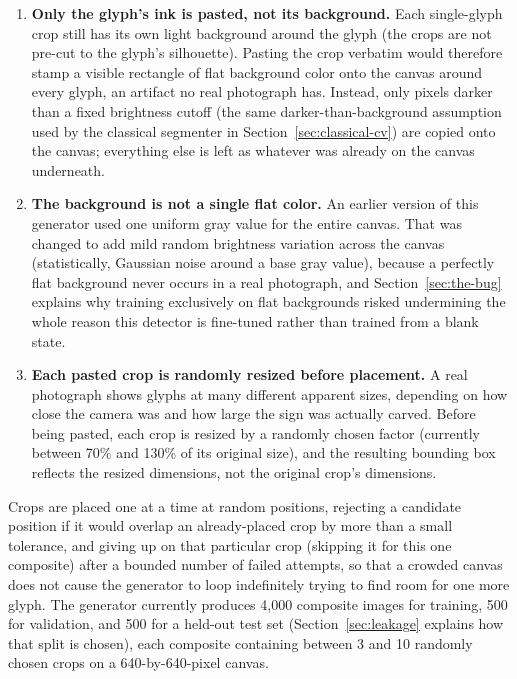 \documentclass[11pt,a4paper]{report}
\begin{document}
\begin{enumerate}[label=(\arabic*)]
  \item \textbf{Only the glyph's ink is pasted, not its background.} Each
    single-glyph crop still has its own light background around the glyph
    (the crops are not pre-cut to the glyph's silhouette). Pasting the crop
    verbatim would therefore stamp a visible rectangle of flat background
    color onto the canvas around every glyph, an artifact no real
    photograph has. Instead, only pixels darker than a fixed brightness
    cutoff (the same darker-than-background assumption used by the
    classical segmenter in Section~\ref{sec:classical-cv}) are copied onto
    the canvas; everything else is left as whatever was already on the
    canvas underneath.
  \item \textbf{The background is not a single flat color.} An earlier
    version of this generator used one uniform gray value for the entire
    canvas. That was changed to add mild random brightness variation across
    the canvas (statistically, Gaussian noise around a base gray value),
    because a perfectly flat background never occurs in a real photograph,
    and Section~\ref{sec:the-bug} explains why training exclusively on flat
    backgrounds risked undermining the whole reason this detector is
    fine-tuned rather than trained from a blank state.
  \item \textbf{Each pasted crop is randomly resized before placement.} A
    real photograph shows glyphs at many different apparent sizes, depending
    on how close the camera was and how large the sign was actually carved.
    Before being pasted, each crop is resized by a randomly chosen factor
    (currently between 70\% and 130\% of its original size), and the
    resulting bounding box reflects the resized dimensions, not the
    original crop's dimensions.
\end{enumerate}

Crops are placed one at a time at random positions, rejecting a candidate
position if it would overlap an already-placed crop by more than a small
tolerance, and giving up on that particular crop (skipping it for this one
composite) after a bounded number of failed attempts, so that a crowded
canvas does not cause the generator to loop indefinitely trying to find room
for one more glyph. The generator currently produces 4{,}000 composite
images for training, 500 for validation, and 500 for a held-out test set
(Section~\ref{sec:leakage} explains how that split is chosen), each
composite containing between 3 and 10 randomly chosen crops on a
640-by-640-pixel canvas.
\end{document}
